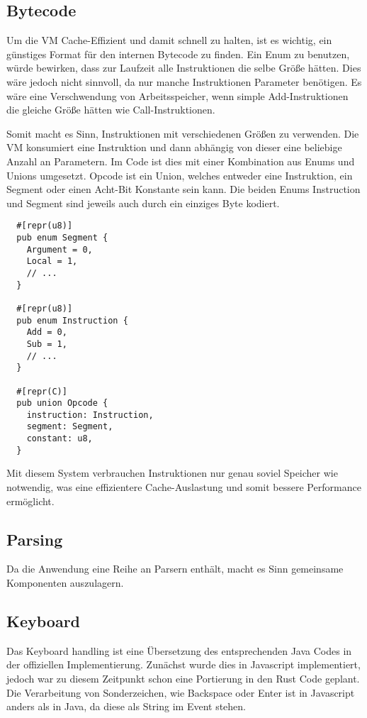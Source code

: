 \subsection{Bytecode}

Um die VM Cache-Effizient und damit schnell zu halten, ist es wichtig, ein günstiges Format für den internen Bytecode zu finden.
Ein Enum zu benutzen, würde bewirken, dass zur Laufzeit alle Instruktionen die selbe Größe hätten. Dies wäre jedoch nicht sinnvoll, da nur manche Instruktionen Parameter benötigen.
Es wäre eine Verschwendung von Arbeitsspeicher, wenn simple Add-Instruktionen die gleiche Größe hätten wie Call-Instruktionen.

Somit macht es Sinn, Instruktionen mit verschiedenen Größen zu verwenden. Die VM konsumiert eine Instruktion und dann abhängig von dieser eine beliebige Anzahl an Parametern.
Im Code ist dies mit einer Kombination aus Enums und Unions umgesetzt. Opcode ist ein Union, welches entweder eine Instruktion, ein Segment oder einen Acht-Bit Konstante sein kann. Die beiden Enums Instruction und Segment sind jeweils auch durch ein einziges Byte kodiert.

\begin{lstlisting}
  #[repr(u8)]
  pub enum Segment {
    Argument = 0,
    Local = 1,
    // ...
  }

  #[repr(u8)]
  pub enum Instruction {
    Add = 0,
    Sub = 1,
    // ...
  }

  #[repr(C)]
  pub union Opcode {
    instruction: Instruction,
    segment: Segment,
    constant: u8,
  }
\end{lstlisting}

Mit diesem System verbrauchen Instruktionen nur genau soviel Speicher wie notwendig, was eine effizientere Cache-Auslastung und somit bessere Performance ermöglicht.

\subsection{Parsing}
Da die Anwendung eine Reihe an Parsern enthält, macht es Sinn gemeinsame Komponenten auszulagern.

\subsection{Keyboard}
Das Keyboard handling ist eine Übersetzung des entsprechenden Java Codes in der offiziellen Implementierung.
Zunächst wurde dies in Javascript implementiert, jedoch war zu diesem Zeitpunkt schon eine Portierung in den Rust Code geplant.
Die Verarbeitung von Sonderzeichen, wie Backspace oder Enter ist in Javascript anders als in Java, da diese als String im Event stehen.
